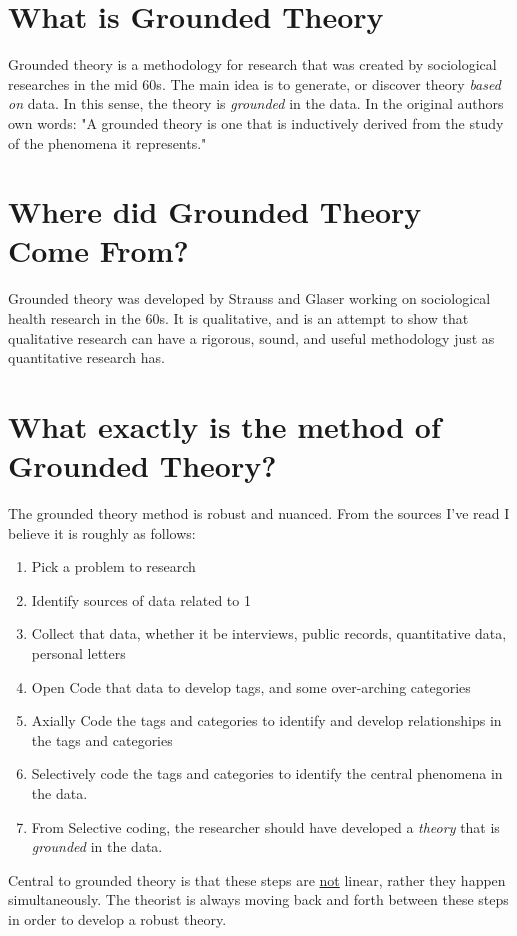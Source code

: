\documentclass[10pt, letterpaper]{article}
\begin{document}
\section*{What is Grounded Theory}
\label{sec:org291f88a}
Grounded theory is a methodology for research that was created by sociological
researches in the mid 60s. The main idea is to generate, or discover theory
\emph{based on} data. In this sense, the theory is \emph{grounded} in the data. In the
original authors own words: "A grounded theory is one that is inductively
derived from the study of the phenomena it represents."\cite{corbin2014basics} 

\section*{Where did Grounded Theory Come From?}
\label{sec:orgb882cb5}
Grounded theory was developed by Strauss and Glaser working on sociological
health research in the 60s. It is qualitative, and is an attempt to show that
qualitative research can have a rigorous, sound, and useful methodology just
as quantitative research has.

\section*{What exactly is the method of Grounded Theory?}
\label{sec:org439a233}
The grounded theory method is robust and nuanced. From the sources I've read I
believe it is roughly as follows:
\begin{enumerate}
\item Pick a problem to research
\item Identify sources of data related to 1
\item Collect that data, whether it be interviews, public records, quantitative
data, personal letters
\item Open Code that data to develop tags, and some over-arching categories
\item Axially Code the tags and categories to identify and develop relationships
in the tags and categories
\item Selectively code the tags and categories to identify the central phenomena
in the data.
\item From Selective coding, the researcher should have developed a \emph{theory} that
is \emph{grounded} in the data.
\end{enumerate}

Central to grounded theory is that these steps are \uline{not} linear, rather they
happen simultaneously. The theorist is always moving back and forth between
these steps in order to develop a robust theory.
\end{document}
